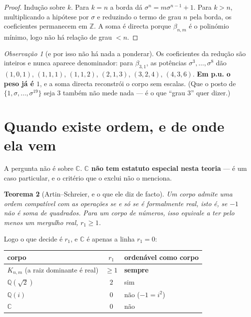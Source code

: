 \documentclass[11pt,a4paper]{article}
\theoremstyle{plain}
\newtheorem{teorema}{Teorema}[section]
\theoremstyle{definition}
\theoremstyle{remark}
\newtheorem{obs}[teorema]{Observação}
\newcommand{\C}{\mathbb{C}}
\newcommand{\Q}{\mathbb{Q}}
\newcommand{\Z}{\mathbb{Z}}
\begin{document}
\begin{proof}
Indução sobre $k$. Para $k=n$ a borda dá $\sigma^n = m\sigma^{n-1}+1$. Para $k>n$, multiplicando a
hipótese por $\sigma$ e reduzindo o termo de grau $n$ pela borda, os coeficientes permanecem em
$\Z$. A soma é directa porque $\beta_{n,m}$ é o polinómio mínimo, logo não há relação de grau
$<n$.
\end{proof}

\begin{obs}[e por isso não há nada a ponderar]
Os coeficientes da redução são inteiros e nunca aparece denominador: para
$\beta_{3,1}$, as potências $\sigma^3,\dots,\sigma^8$ dão
$(1,0,1)$, $(1,1,1)$, $(1,1,2)$, $(2,1,3)$, $(3,2,4)$, $(4,3,6)$. \textbf{Em p.u. o peso já é $1$},
e a soma directa reconstrói o corpo sem escalas. (Que o posto de
$\{1,\sigma,\dots,\sigma^{19}\}$ seja $3$ também não mede nada --- é o que ``grau $3$'' quer
dizer.)
\end{obs}

\section{Quando existe ordem, e de onde ela vem}\label{sec:ordem}

A pergunta não é sobre $\C$. \textbf{$\C$ não tem estatuto especial nesta teoria} --- é um caso
particular, e o critério que o exclui não o menciona.

\begin{teorema}[Artin--Schreier, e o que ele diz de facto]
Um corpo admite uma ordem compatível com as operações se e só se é \emph{formalmente real}, isto é,
se $-1$ não é soma de quadrados. Para um corpo de números, isso equivale a ter pelo menos um
mergulho real, $r_1 \geq 1$.
\end{teorema}

\noindent Logo o que decide é $r_1$, e $\C$ é apenas a linha $r_1 = 0$:

\begin{center}\small
\begin{tabular}{lcl}
\hline
corpo & $r_1$ & ordenável como corpo \\ \hline
$K_{n,m}$ (a raiz dominante é real) & $\geq 1$ & \textbf{sempre} \\
$\Q(\sqrt2)$ & $2$ & sim \\
$\Q(i)$ & $0$ & não ($-1 = i^2$) \\
$\C$ & $0$ & não \\
\hline
\end{tabular}
\end{center}
\end{document}
